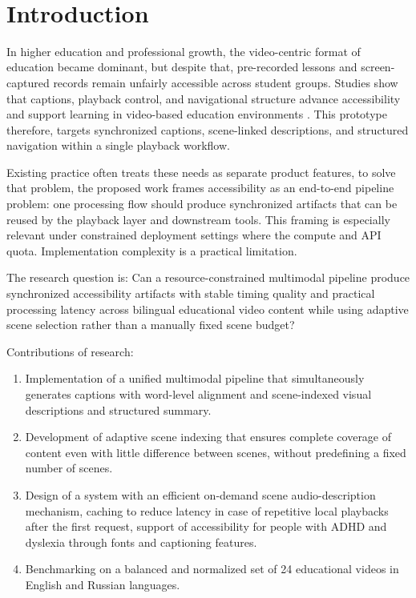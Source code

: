 ﻿﻿\documentclass[conference]{IEEEtran}
\begin{document}
\section{Introduction}
In higher education and professional growth, the video-centric format of education became dominant, but despite that, pre-recorded lessons and screen-captured records remain unfairly accessible across student groups. Studies show that captions, playback control, and navigational structure advance accessibility and support learning in video-based education environments \cite{Gernsbacher2015,Mayer2020,Horlin2024}. This prototype therefore, targets synchronized captions, scene-linked descriptions, and structured navigation within a single playback workflow.

Existing practice often treats these needs as separate product features, to solve that problem, the proposed work frames accessibility as an end-to-end pipeline problem: one processing flow should produce synchronized artifacts that can be reused by the playback layer and downstream tools. This framing is especially relevant under constrained deployment settings where the compute and API quota. Implementation complexity is a practical limitation.

The research question is: Can a resource-constrained multimodal pipeline produce synchronized accessibility artifacts with stable timing quality and practical processing latency across bilingual educational video content while using adaptive scene selection rather than a manually fixed scene budget?

Contributions of research:
\begin{enumerate}
\item Implementation of a unified multimodal pipeline that simultaneously generates captions with word-level alignment and scene-indexed visual descriptions and structured summary.
\item Development of adaptive scene indexing that ensures complete coverage of content even with little difference between scenes, without predefining a fixed number of scenes.
\item Design of a system with an efficient on-demand scene audio-description mechanism, caching to reduce latency in case of repetitive local playbacks after the first request, support of accessibility for people with ADHD and dyslexia through fonts and captioning features.
\item Benchmarking on a balanced and normalized set of 24 educational videos in English and Russian languages.
\end{enumerate}
\end{document}
